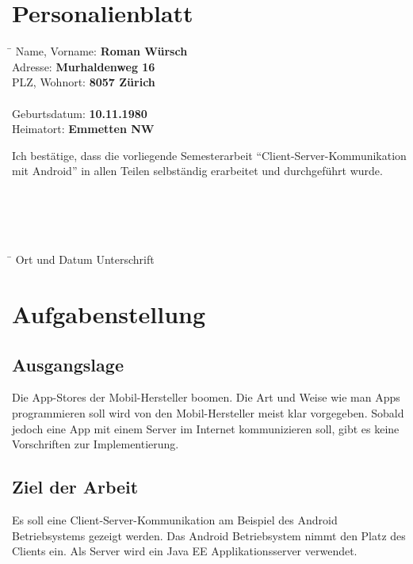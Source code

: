 \documentclass[abstracton, listof=totocnumbered,
bibliography=totocnumbered]{scrreprt}
\begin{document}
  \chapter{Personalienblatt}
  \begin{tabbing}
    \hspace*{6cm}\= \kill
    Name, Vorname: \> {\bf Roman Würsch} \\
    Adresse: \> {\bf Murhaldenweg 16} \\
    PLZ, Wohnort: \> {\bf 8057 Zürich} \\
    \\
    Geburtsdatum: \> {\bf 10.11.1980} \\
    Heimatort: \> {\bf Emmetten NW} \\
  \end{tabbing}
  Ich bestätige, dass die vorliegende Semesterarbeit
  ``Client-Server-Kommunikation mit Android'' in allen Teilen selbständig
  erarbeitet und durchgeführt wurde.
  \\
  \\
  \\
  \\
  \\
  \begin{tabbing}
    \hspace*{6cm}\= \kill
    Ort und Datum \> {Unterschrift} \\
  \end{tabbing}
  
  \newpage
  
  
  \newpage
  
  \chapter{Aufgabenstellung}
  
  \section{Ausgangslage}
  Die App-Stores der Mobil-Hersteller boomen. Die Art und Weise wie man Apps
  programmieren soll wird von den Mobil-Hersteller meist klar vorgegeben.
  Sobald jedoch eine App mit einem Server im Internet kommunizieren soll, gibt
  es keine Vorschriften zur Implementierung.
  
  \section{Ziel der Arbeit}
  Es soll eine Client-Server-Kommunikation am Beispiel des Android
  Betriebsystems gezeigt werden. Das Android Betriebsystem nimmt den
  Platz des Clients ein. Als Server wird ein Java EE Applikationsserver
  verwendet.\newline
  
\end{document}
